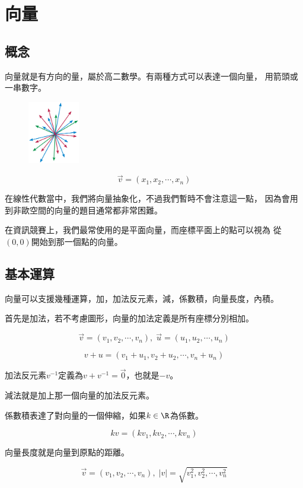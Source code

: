 \section{向量}
    \subsection{概念}
    向量就是有方向的量，屬於高二數學。有兩種方式可以表達一個向量，
    用箭頭或一串數字。

    \begin{figure}[!htbp]
        \centering
        \includegraphics[width=0.2\textwidth]{../Images/Vector.png}
    \end{figure}

    $$
    \vec{v}=(x_1,x_2, \cdots ,x_n)
    $$

    在線性代數當中，我們將向量抽象化，不過我們暫時不會注意這一點，
    因為會用到非歐空間的向量的題目通常都非常困難。

    在資訊競賽上，我們最常使用的是平面向量，而座標平面上的點可以視為
    從$(0,0)$開始到那一個點的向量。

    \subsection{基本運算}
    向量可以支援幾種運算，加，加法反元素，減，係數積，向量長度，內積。

    首先是加法，若不考慮圖形，向量的加法定義是所有座標分別相加。

    $$\vec{v}=(v_1,v_2, \cdots ,v_n) , \; \vec{u}=(u_1,u_2, \cdots ,u_n)$$

    $$v+u=(v_1+u_1,v_2+u_2, \cdots ,v_n+u_n)$$

    加法反元素$v^{-1}$定義為$v+v^{-1}=\vec{0}$，也就是$-v$。

    減法就是加上那一個向量的加法反元素。

    係數積表達了對向量的一個伸縮，如果$k \in \R$為係數。

    $$kv=(kv_1,kv_2, \cdots ,kv_n)$$

    向量長度就是向量到原點的距離。

    $$\vec{v}=(v_1,v_2, \cdots ,v_n), \; |v|=\sqrt{v_1^2,v_2^2, \cdots ,v_n^2}$$


